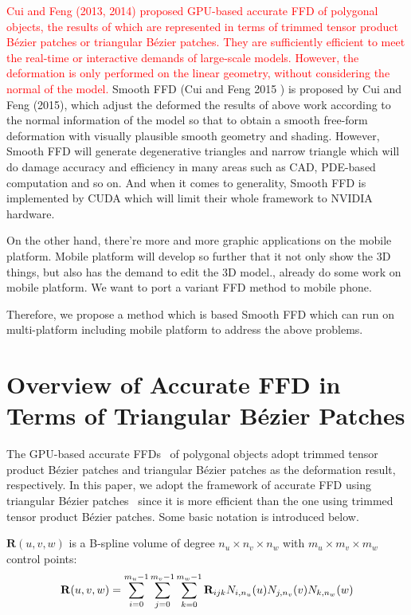 \documentclass[3p]{elsarticle}
\begin{document}
\textcolor{red}{Cui and Feng (2013, 2014) proposed GPU-based accurate FFD of polygonal objects, the results of which are
represented in terms of trimmed tensor product Bézier patches or triangular Bézier patches. They are sufficiently
efficient to meet the real-time or interactive demands of large-scale models. However, the deformation is only performed
on the linear geometry, without considering the normal of the model.}
Smooth FFD (Cui and Feng 2015 ) is proposed by Cui and Feng (2015), which adjust the deformed the results of above work according to the normal information of the model so that to obtain a smooth free-form deformation with visually plausible smooth geometry and shading. However, Smooth FFD will generate degenerative triangles and narrow triangle which will do damage accuracy and efficiency in many areas such as CAD, PDE-based computation and so on. And when it comes to generality, Smooth FFD is implemented by CUDA which will limit their whole framework to NVIDIA hardware.

On the other hand, there're more and more graphic applications on the mobile platform. Mobile platform will develop so further that it not only show the 3D things, but also has the demand to edit the 3D model.\cite{mobile1}, \cite{mobile2} already do some work on mobile platform. We want to port a variant FFD method to mobile phone.

Therefore, we propose a method which is based Smooth FFD which can run on multi-platform including mobile platform to address the above problems.


\section{Overview of Accurate FFD in Terms of Triangular B\'ezier Patches}

The GPU-based accurate FFDs~\cite{Cui13, Cui14} of polygonal objects adopt trimmed tensor product B\'ezier patches and
triangular B\'ezier patches as the deformation result, respectively. In this paper, we adopt the framework of accurate
FFD using triangular B\'ezier patches~\cite{Feng98, Feng00, Cui14} since it is more efficient than the one using trimmed
tensor product B\'ezier patches. Some basic notation is introduced below.

$\mathbf R(u,v,w)$ is a B-spline volume of degree $n_u\times n_v\times n_w$ with $m_u\times m_v\times m_w$ control
points:
\begin{equation}
	\footnotesize
	{\mathbf R}(u,v,w) 
	= \sum_{i=0}^{m_u-1}\sum_{j=0}^{m_v-1}\sum_{k=0}^{m_w-1} {\mathbf
	R}_{ijk}N_{i,n_u}(u)N_{j,n_v}(v)N_{k,n_w}(w)
	\label{equ:Ruvw}
\end{equation}
\end{document}

